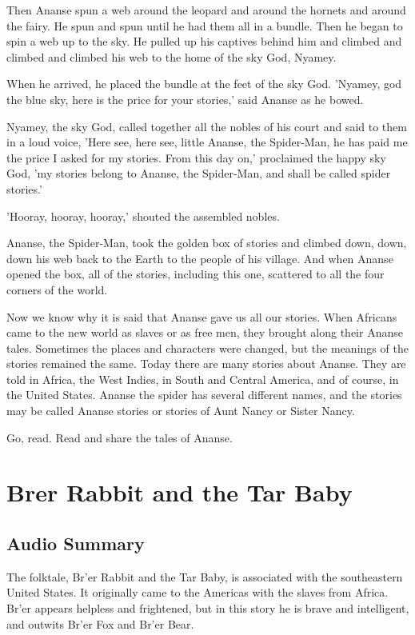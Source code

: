 Then Ananse spun a web around the leopard and around the hornets and around the fairy. He spun and spun until he had them all in a bundle. Then he began to spin a web up to the sky. He pulled up his captives behind him and climbed and climbed and climbed his web to the home of the sky God, Nyamey.

When he arrived, he placed the bundle at the feet of the sky God. 'Nyamey, god the blue sky, here is the price for your stories,' said Ananse as he bowed.

Nyamey, the sky God, called together all the nobles of his court and said to them in a loud voice, 'Here see, here see, little Ananse, the Spider-Man, he has paid me the price I asked for my stories. From this day on,' proclaimed the happy sky God, 'my stories belong to Ananse, the Spider-Man, and shall be called spider stories.'

'Hooray, hooray, hooray,' shouted the assembled nobles.

Ananse, the Spider-Man, took the golden box of stories and climbed down, down, down his web back to the Earth to the people of his village. And when Ananse opened the box, all of the stories, including this one, scattered to all the four corners of the world.

Now we know why it is said that Ananse gave us all our stories. When Africans came to the new world as slaves or as free men, they brought along their Ananse tales. Sometimes the places and characters were changed, but the meanings of the stories remained the same. Today there are many stories about Ananse. They are told in Africa, the West Indies, in South and Central America, and of course, in the United States. Ananse the spider has several different names, and the stories may be called Ananse stories or stories of Aunt Nancy or Sister Nancy.

Go, read. Read and share the tales of Ananse.

\section{Brer Rabbit and the Tar Baby}

\subsection{Audio Summary}

The folktale, Br'er Rabbit and the Tar Baby, is associated with the southeastern United States.
It originally came to the Americas with the slaves from Africa.
Br'er appears helpless and frightened, but in this story he is brave and intelligent, and outwits Br'er Fox and Br'er Bear.

